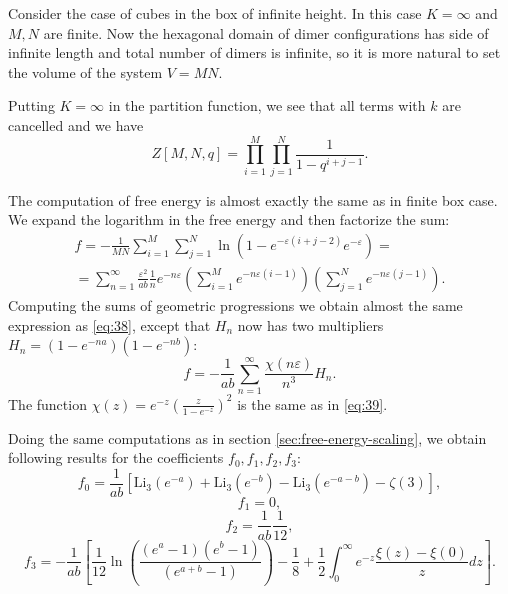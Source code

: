 \documentclass{article}
\newcommand{\Li}{\mathrm{Li}}
\begin{document}
Consider the case of cubes in the box of infinite height. In this case $K=\infty$ and $M,N$ are
finite. Now the hexagonal domain of dimer configurations has side of infinite length and total
number of dimers is infinite, so it is more natural to set the volume of the system $V=MN$.  

Putting $K=\infty$ in the partition function, we see that all terms with $k$ are cancelled and we have
\begin{equation}
  \label{eq:3}
  Z[M,N,q]=\prod_{i=1}^{M}\prod_{j=1}^{N}\frac{1}{1-q^{i+j-1}}.
\end{equation}

The computation of free energy is almost exactly the same as in finite box case. We expand the
logarithm in the free energy and then factorize the sum:
\begin{multline}
  \label{eq:4}
  f=-\frac{1}{MN}\sum_{i=1}^{M}\sum_{j=1}^{N}\ln\left(1-e^{-\varepsilon(i+j-2)}e^{-\varepsilon}\right)=\\
  =\sum_{n=1}^{\infty}\frac{\varepsilon^{2}}{ab}\frac{1}{n}e^{-n\varepsilon}\left(\sum_{i=1}^{M}e^{-n\varepsilon(i-1)}\right)
  \left(\sum_{j=1}^{N}e^{-n\varepsilon(j-1)}\right).
\end{multline}
Computing the sums of geometric progressions we obtain almost the same expression as \eqref{eq:38},
except that $H_{n}$ now has two multipliers $H_{n} =\left(1-e^{-na}\right)\left(1-e^{-nb}\right)$:
\begin{equation}
  \label{eq:5}
  f=-\frac{1}{ab} \sum_{n=1}^{\infty}\frac{\chi(n\varepsilon)}{n^{3}} H_{n}.
\end{equation}
The function $\chi(z)=e^{-z}\left(\frac{z}{1-e^{-z}}\right)^{2}$ is the same as in \eqref{eq:39}.

Doing the same computations as in section \ref{sec:free-energy-scaling}, we obtain following results
for the coefficients $f_{0}, f_{1}, f_{2}, f_{3}$:
\begin{equation}
  \label{eq:6}
  f_{0}=\frac{1}{ab}\left[\Li_{3}(e^{-a})+\Li_{3}(e^{-b})-
    \Li_{3}(e^{-a-b})-\zeta(3)\right],
\end{equation}
\begin{equation}
  \label{eq:8}
  f_{1}=0,
\end{equation}
\begin{equation}
  \label{eq:9}
  f_{2}=\frac{1}{ab}\frac{1}{12},
\end{equation}
\begin{equation}
  \label{eq:11}
  f_{3}=-\frac{1}{ab}\left[\frac{1}{12}\ln\left(\frac{(e^{a}-1)(e^{b}-1)}{(e^{a+b}-1)}\right)-\frac{1}{8}+ \frac{1}{2}\int_{0}^{\infty} e^{-z}\frac{\xi(z)-\xi(0)}{z} dz
    \right].
\end{equation}
\end{document}
